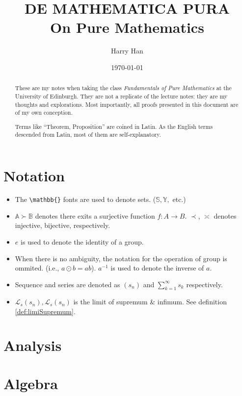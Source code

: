 \documentclass[12pt, a4paper]{report}
\title{
	DE MATHEMATICA PURA \\
	\large On Pure Mathematics
}
\author{Harry Han}
\date{\today}
\theoremstyle{definition}
\theoremstyle{definition}
\theoremstyle{remark}
\begin{document}
\maketitle
\tableofcontents

\newpage

\begin{abstract}
	These are my notes when taking the class \emph{Fundamentals of Pure Mathematics} at the University of Edinburgh. They are not a replicate of the lecture notes: they are my thoughts and explorations. 
	Most importantly, all proofs presented in this document are of my own conception. 

	Terms like ``Theorem, Proposition'' are coined in Latin. As the English terms descended from Latin, most of them are self-explanatory. 
\end{abstract}
\chapter{Notation}

\begin{itemize}
	\item The \verb|\mathbb{}| fonts are used to denote sets. ($\mathbb{S}, \mathbb{Y},$ etc.)
	\item $\mathbb{A} \succ \mathbb{B}$ denotes there exits a surjective function $f:A\rightarrow B$. $\prec$, $\asymp$ denotes injective, bijective, respectively.
	\item $e$ is used to denote the identity of a group.
	\item When there is no ambiguity, the notation for the operation of group is ommited. (i.e., $a \odot b = ab$).
		$a^{-1}$ is used to denote the inverse of $a$.
	\item Sequence and series are denoted as $(s_n)$ and $\sum^{\infty}_{k=1}s_k$ respectively.
	\item $\mathcal{L}_s(s_n), \mathcal{L}_s(s_n)$ is the limit of supremum \& infimum. See definition \ref{def:limiSupremum}.

\end{itemize}

\chapter{Analysis}




\chapter{Algebra}



\appendix


\printbibliography
\end{document}
